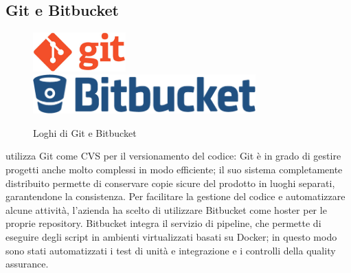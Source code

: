    \subsection{Git e Bitbucket}
   \begin{figure}[htbp]
      \centering
      {\includegraphics[height=1.5cm,keepaspectratio]{immagini/git-logo} }
      \qquad
      {\includegraphics[height=1.5cm,keepaspectratio]{immagini/bitbucket-logo} }
      \caption{Loghi di Git e Bitbucket}
   \end{figure}
   \nomeAzienda{} utilizza Git come CVS per il versionamento del codice: Git è in grado di gestire progetti anche molto complessi in modo efficiente; il suo sistema completamente distribuito permette di conservare copie sicure del prodotto in luoghi separati, garantendone la consistenza. Per facilitare la gestione del codice e automatizzare alcune attività, l'azienda ha scelto di utilizzare Bitbucket come hoster per le proprie repository. Bitbucket integra il servizio di pipeline, che permette di eseguire degli script in ambienti virtualizzati basati su Docker; in questo modo sono stati automatizzati i test di unità e integrazione e i controlli della quality assurance.

